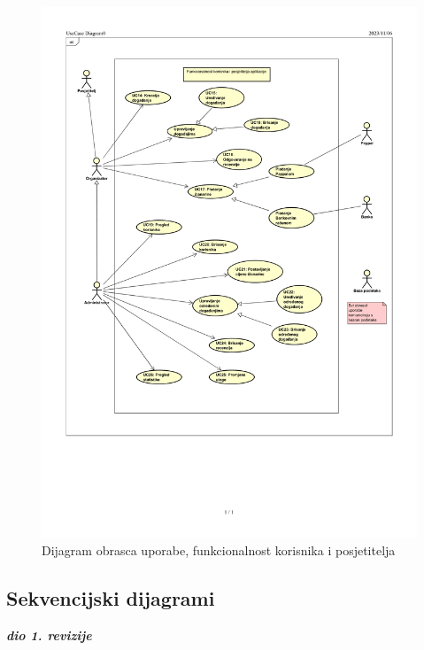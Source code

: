 					\begin{figure}[H]
						\includegraphics[scale=0.6]{slike/UC_dijagram2-1.PNG} %
						\centering
						\caption{Dijagram obrasca uporabe, funkcionalnost korisnika i posjetitelja}
						\label{fig:promjene}
					\end{figure}
				\eject		
				
			\subsection{Sekvencijski dijagrami}
				
				\textbf{\textit{dio 1. revizije}}\\
				
				
